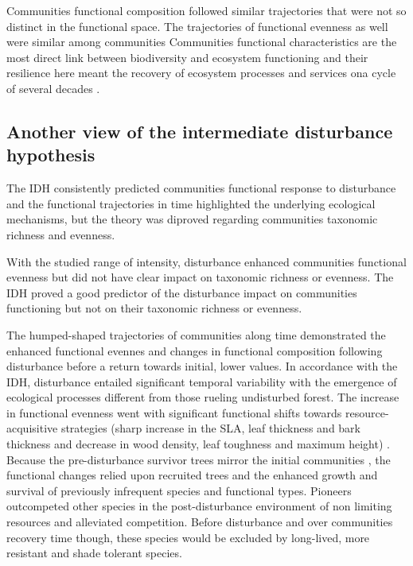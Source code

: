 \documentclass[fleqn,10pt]{ArtEcoFoG} %
\theoremstyle{definition}
\theoremstyle{definition}
\theoremstyle{definition}
\theoremstyle{remark}
\begin{document}
Communities functional composition followed similar trajectories that
were not so distinct in the functional space. The trajectories of
functional evenness as well were similar among communities Communities
functional characteristics are the most direct link between biodiversity
and ecosystem functioning and their resilience here meant the recovery
of ecosystem processes and services ona cycle of several decades
\citep{Diaz2005, Guariguata2001}.

\subsection{Another view of the intermediate disturbance
hypothesis}\label{another-view-of-the-intermediate-disturbance-hypothesis}

The IDH consistently predicted communities functional response to
disturbance and the functional trajectories in time highlighted the
underlying ecological mechanisms, but the theory was diproved regarding
communities taxonomic richness and evenness.

With the studied range of intensity, disturbance enhanced communities
functional evenness but did not have clear impact on taxonomic richness
or evenness. The IDH proved a good predictor of the disturbance impact
on communities functioning but not on their taxonomic richness or
evenness.

The humped-shaped trajectories of communities along time demonstrated
the enhanced functional evennes and changes in functional composition
following disturbance before a return towards initial, lower values. In
accordance with the IDH, disturbance entailed significant temporal
variability with the emergence of ecological processes different from
those rueling undisturbed forest. The increase in functional evenness
went with significant functional shifts towards resource-acquisitive
strategies (sharp increase in the SLA, leaf thickness and bark thickness
and decrease in wood density, leaf toughness and maximum height)
\citep{Westoby1998, Wright2004, Reich2014}. Because the pre-disturbance
survivor trees mirror the initial communities \citep{Herault2018}, the
functional changes relied upon recruited trees and the enhanced growth
and survival of previously infrequent species and functional types.
Pioneers outcompeted other species in the post-disturbance environment
of non limiting resources and alleviated competition. Before disturbance
and over communities recovery time though, these species would be
excluded by long-lived, more resistant and shade tolerant species.
\end{document}
